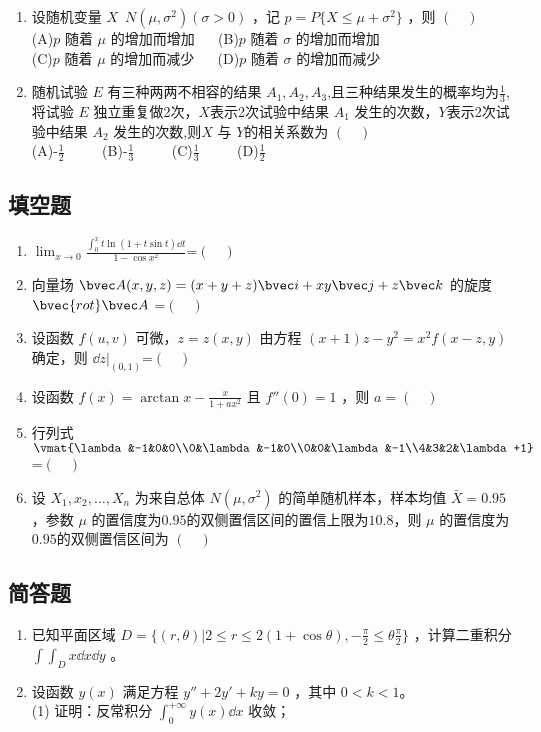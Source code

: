 \begin{enumerate}
\item 设随机变量 $X$~$N(\mu,\sigma^2)(\sigma>0)$  ，记  $p=P\{X \le \mu +\sigma ^2\}$ ，则 $(\quad)$\\
(A)$p$ 随着 $\mu$ 的增加而增加  $\quad$
(B)$p$ 随着 $\sigma$ 的增加而增加\\
(C)$p$ 随着 $\mu$ 的增加而减少 $\quad$
(D)$p$ 随着 $\sigma$ 的增加而减少
\item 随机试验 $E$ 有三种两两不相容的结果 $A_1,A_2,A_3$,且三种结果发生的概率均为$\frac1 3$,将试验 $E$ 独立重复做2次，$X$表示2次试验中结果 $A_1$ 发生的次数，$Y$表示2次试验中结果 $A_2$ 发生的次数,则$X$ 与 $Y$的相关系数为  $(\quad)$\\
(A)-$\frac1 2$ $\qquad$
(B)-$\frac1 3$ $\qquad$
(C)$\frac1 3$ $\qquad$
(D)$\frac1 2$
\end{enumerate}

\subsection{填空题}
\begin{enumerate}
\item $\displaystyle \lim_{{x\to 0 }} \frac{\int_0^x t\ln(1+t\sin t)\dd{t}}{1-\cos x^2} $=$(\quad)$
\item 向量场 $\bvec A(x,y,z)=(x+y+z)\bvec i+xy \bvec j+z \bvec k$ 的旋度 $\bvec {rot} \bvec A$ =$(\quad)$
\item 设函数 $f(u,v)$ 可微，$z=z(x,y)$   由方程 $(x+1)z-y^2=x^2f(x-z,y)$  确定，则 $\dd{z}|_{(0,1)}$=$(\quad)$
\item 设函数 $\displaystyle f(x)=\arctan x-\frac{x}{1+ax^2}$  且 $f''(0)=1$ ，则 $a=(\quad)$
\item 行列式 $\vmat{\lambda&-1&0&0\\0&\lambda&-1&0\\0&0&\lambda&-1\\4&3&2&\lambda+1}$=$(\quad)$
\item 设 $X_1,x_2,\dots,X_n$ 为来自总体 $N(\mu,\sigma^2)$  的简单随机样本，样本均值 $\bar X=0.95$  ，参数 $\mu$ 的置信度为$0.95$的双侧置信区间的置信上限为$10.8$，则 $\mu$ 的置信度为$0.95$的双侧置信区间为 $(\quad)$
\end{enumerate}


\subsection{简答题}
\begin{enumerate}
\item 已知平面区域 $\displaystyle D=\{(r,\theta)|2 \le r \le 2(1+\cos \theta),-\frac{\pi}{2} \le \theta \frac{\pi}{2}\}$  ，计算二重积分 $\displaystyle \int\int_D x\dd{x}\dd{y}$ 。
\item 设函数 $y(x)$ 满足方程 $y''+2y'+ky=0$ ，其中 $0<k<1$。\\
(1) 证明：反常积分  $\displaystyle \int_0^{+\infty} y(x)\dd{x}$ 收敛；
\end{enumerate}
